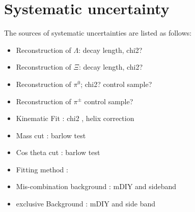 \section{Systematic uncertainty}
The sources of systematic uncertainties are listed as follows:

\begin{itemize}
	\item Reconstruction of $\Lambda$: decay length, chi2?
	\item Reconstruction of $\Xi$: decay length, chi2?
	\item Reconstruction of $\pi^0$; chi2? control sample?
	\item Reconstruction of $\pi^\pm$ control sample?
	\item Kinematic Fit :  chi2 , helix correction
	\item Mass cut : barlow test
	\item Cos theta cut : barlow test
	\item Fitting method : 
	\item Mis-combination background : mDIY and sideband
	\item exclusive Background : mDIY and side band
\end{itemize}
